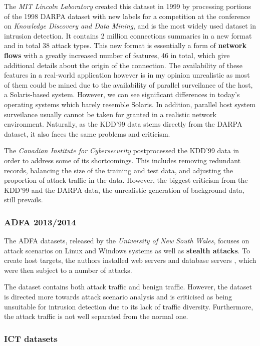 The \textit{MIT Lincoln Laboratory} created this dataset in 1999 by processing portions of the 1998 DARPA dataset with new labels for a competition at the conference on \textit{Knowledge Discovery and Data Mining}, and is the most widely used dataset in intrusion detection. It contains 2 million connections summaries in a new format and in total 38 attack types. This new format is essentially a form of \textbf{network flows} with a greatly increased number of features, 46 in total, which give additional details about the origin of the connection. The availability of these features in a real-world application however is in my opinion unrealistic as most of them could be mined due to the availability of parallel surveilance of the host, a Solaris-based system. However, we can see significant differences in today's operating systems which barely resemble Solaris. In addition, parallel host system surveilance usually cannot be taken for granted in a realistic network environment. Naturally, as the KDD'99 data stems directly from the DARPA dataset, it also faces the same problems and criticism. 

The \textit{Canadian Institute for Cybersecurity} postprocessed the KDD'99 data in order to address some of its shortcomings. This includes removing redundant records, balancing the size of the training and test data, and adjusting the proportion of attack traffic in the data. However, the biggest criticism from the KDD'99 and the DARPA data, the unrealistic generation of background data, still prevails.


\subsubsection*{ADFA 2013/2014 \cite{creech2014developing,creech2013generation}}

The ADFA datasets, released by the \textit{University of New South Wales}, focuses on attack scenarios on Linux and Windows systems as well as \textbf{stealth attacks}. To create host targets, the authors  installed web servers and database servers , which were then subject to a number of attacks. 

The dataset contains both attack traffic and benign traffic. However, the dataset is directed more towards attack scenario analysis and is criticised as being unsuitable for intrusion detection due to its lack of traffic diversity. Furthermore, the attack traffic is not well separated from the normal one.

\subsubsection*{ICT datasets \cite{USC2010ICT}}

